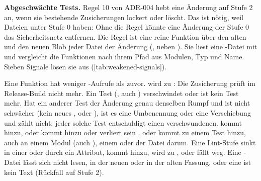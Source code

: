 {\bf Abgeschwächte Tests.}
Regel 10 von ADR-004 hebt eine Änderung auf Stufe 2 an, wenn sie bestehende Zusicherungen
lockert oder löscht.
Das ist nötig, weil Dateien unter  Stufe 0 haben:
Ohne die Regel könnte eine Änderung der Stufe 0 das Sicherheitsnetz entfernen.
Die Regel ist eine reine Funktion über den alten und den neuen Blob jeder Datei der Änderung
(, neben ).
Sie liest eine -Datei mit  und vergleicht die Funktionen
nach ihrem Pfad aus Modulen, Typ und Name.
Sieben Signale lösen sie aus ([tab:weakened-signals]).

\startplacetable[title={Die Signale für abgeschwächte Tests},reference=tab:weakened-signals]
\startxtable[frame=off,option=stretch]
\startxrow[topframe=on,bottomframe=on]
 \stopxcell
{} \stopxcell
\stopxrow
\startxrow
{} \stopxcell
\startxcell Eine Funktion hat weniger -Aufrufe als zuvor. \stopxcell
\stopxrow
\startxrow
{} \stopxcell
\startxcell {} wird zu : Die Zusicherung prüft im
Release-Build nicht mehr. \stopxcell
\stopxrow
\startxrow
{} \stopxcell
\startxcell Ein Test (\type{#[test]}, auch \type{#[x::test]}) verschwindet oder ist kein Test mehr.
Hat ein anderer Test der Änderung genau denselben Rumpf und ist nicht schwächer
(kein neues ,  oder ), ist es eine Umbenennung oder
eine Verschiebung und zählt nicht; jeder solche Test entschuldigt einen verschwundenen. \stopxcell
\stopxrow
\startxrow
{} \stopxcell
\startxcell \type{#[ignore]} kommt hinzu, oder  kommt hinzu
oder verliert sein . \stopxcell
\stopxrow
\startxrow
{} \stopxcell
\startxcell \type{#[cfg(...)]} oder  kommt zu einem Test hinzu,
auch an einem Modul (auch ), einem  oder der Datei darum.
\stopxcell
\stopxrow
\startxrow
{} \stopxcell
\startxcell Eine Lint-Stufe sinkt in \type{[lints]} einer  oder durch ein Attribut,
\type{#[allow]} kommt hinzu, \type{#[expect]} wird zu \type{#[allow]},
oder  fällt weg. \stopxcell
\stopxrow
\startxrow[bottomframe=on]
 \stopxcell
\startxcell Eine -Datei lässt sich nicht lesen, in der neuen oder in der alten
Fassung, oder eine  ist kein Text (Rückfall auf Stufe 2). \stopxcell
\stopxrow
\stopxtable
\stopplacetable

